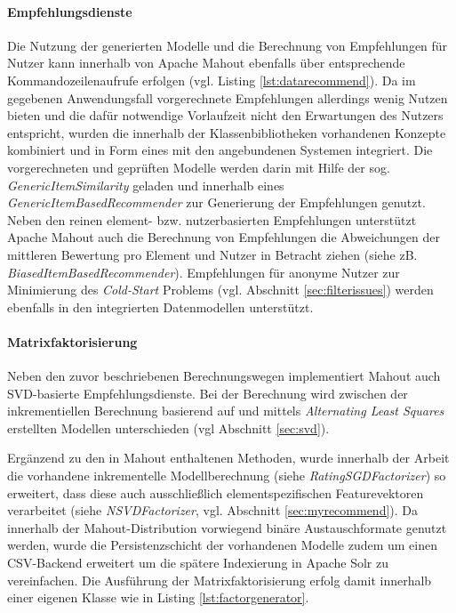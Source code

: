 \paragraph{Empfehlungsdienste} Die Nutzung der generierten Modelle und die Berechnung von Empfehlungen für Nutzer kann innerhalb von Apache Mahout ebenfalls über entsprechende Kommandozeilenaufrufe erfolgen (vgl. Listing \ref{lst:datarecommend}). Da im gegebenen Anwendungsfall vorgerechnete Empfehlungen allerdings wenig Nutzen bieten und die dafür notwendige Vorlaufzeit nicht den Erwartungen des Nutzers entspricht, wurden die innerhalb der Klassenbibliotheken vorhandenen Konzepte kombiniert und in Form eines  mit den angebundenen Systemen integriert. Die vorgerechneten und geprüften Modelle werden darin mit Hilfe der sog. \textit{GenericItemSimilarity} geladen und innerhalb eines \textit{GenericItemBasedRecommender} zur Generierung der Empfehlungen genutzt. Neben den reinen element- bzw. nutzerbasierten Empfehlungen unterstützt Apache Mahout auch die Berechnung von Empfehlungen die Abweichungen der mittleren Bewertung pro Element und Nutzer in Betracht ziehen (siehe zB. \textit{BiasedItemBasedRecommender}). Empfehlungen für anonyme Nutzer zur Minimierung des \textit{Cold-Start} Problems (vgl. Abschnitt \ref{sec:filterissues}) werden ebenfalls in den integrierten Datenmodellen unterstützt. 

 

\paragraph{Matrixfaktorisierung} Neben den zuvor beschriebenen Berechnungswegen implementiert Mahout auch \acs{SVD}-basierte Empfehlungsdienste. Bei der Berechnung wird zwischen der inkrementiellen Berechnung basierend auf \citep{funk2006}  und mittels \textit{Alternating Least Squares} \citep{Bell:2007:SCF:1441428.1442050,zhou08}  erstellten Modellen unterschieden (vgl Abschnitt \ref{sec:svd}).



Ergänzend zu den in Mahout enthaltenen Methoden, wurde innerhalb der Arbeit die vorhandene inkrementelle Modellberechnung (siehe \textit{RatingSGDFactorizer}) so erweitert, dass diese auch ausschließlich elementspezifischen Featurevektoren verarbeitet (siehe \textit{NSVDFactorizer}, vgl. Abschnitt \ref{sec:myrecommend}). Da innerhalb der Mahout-Distribution vorwiegend binäre Austauschformate genutzt werden, wurde die Persistenzschicht der vorhandenen Modelle zudem um einen CSV-Backend erweitert um die spätere Indexierung in Apache Solr zu vereinfachen. Die Ausführung der Matrixfaktorisierung erfolg damit innerhalb einer eigenen Klasse wie in Listing \ref{lst:factorgenerator}.

